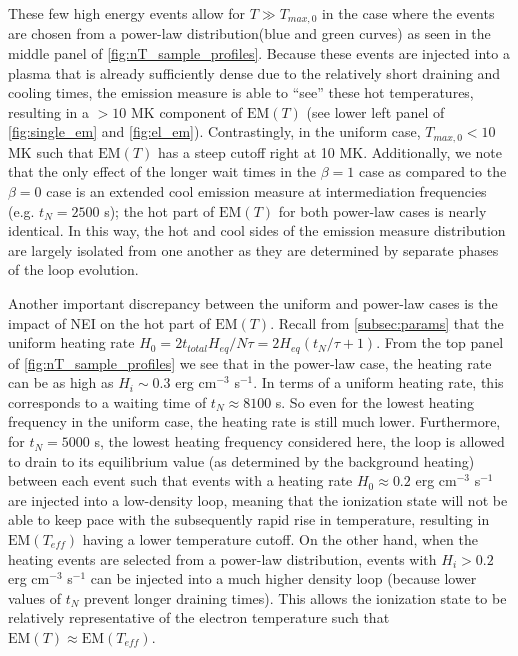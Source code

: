 \documentclass[apj]{emulateapj}
\begin{document}
	\par These few high energy events allow for $T\gg T_{max,0}$ in the case where the events are chosen from a power-law distribution(blue and green curves) as seen in the middle panel of \autoref{fig:nT_sample_profiles}. Because these events are injected into a plasma that is already sufficiently dense due to the relatively short draining and cooling times, the emission measure is able to ``see'' these hot temperatures, resulting in a $>10$ MK component of $\mathrm{EM}(T)$ (see lower left panel of \autoref{fig:single_em} and \autoref{fig:el_em}). Contrastingly, in the uniform case, $T_{max,0}<10$ MK such that $\mathrm{EM}(T)$ has a steep cutoff right at 10 MK. Additionally, we note that the only effect of the longer wait times in the $\beta=1$ case as compared to the $\beta=0$ case is an extended cool emission measure at intermediation frequencies (e.g. $t_N=2500$ s); the hot part of $\mathrm{EM}(T)$ for both power-law cases is nearly identical. In this way, the hot and cool sides of the emission measure distribution are largely isolated from one another as they are determined by separate phases of the loop evolution.
	\par Another important discrepancy between the uniform and power-law cases is the impact of NEI on the hot part of $\mathrm{EM}(T)$. Recall from \autoref{subsec:params} that the uniform heating rate $H_0=2t_{total}H_{eq}/N\tau=2H_{eq}(t_N/\tau+1)$. From the top panel of \autoref{fig:nT_sample_profiles} we see that in the power-law case, the heating rate can be as high as $H_i\sim0.3$ erg cm$^{-3}$ s$^{-1}$. In terms of a uniform heating rate, this corresponds to a waiting time of $t_N\approx8100$ s. So even for the lowest heating frequency in the uniform case, the heating rate is still much lower. Furthermore, for $t_N=5000$ s, the lowest heating frequency considered here, the loop is allowed to drain to its equilibrium value (as determined by the background heating) between each event such that events with a heating rate $H_0\approx0.2$ erg cm$^{-3}$ s$^{-1}$ are injected into a low-density loop, meaning that the ionization state will not be able to keep pace with the subsequently rapid rise in temperature, resulting in $\mathrm{EM}(T_{eff})$ having a lower temperature cutoff. On the other hand, when the heating events are selected from a power-law distribution, events with $H_i>0.2$ erg cm$^{-3}$ s$^{-1}$ can be injected into a much higher density loop (because lower values of $t_N$ prevent longer draining times). This allows the ionization state to be relatively representative of the electron temperature such that $\mathrm{EM}(T)\approx\mathrm{EM}(T_{eff})$.
\end{document}
